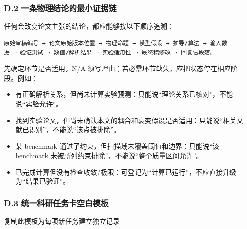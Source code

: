 \documentclass[
  chinese,
  UTF8]{ctexart}
\providecommand{\tightlist}{%
  \setlength{\itemsep}{0pt}\setlength{\parskip}{0pt}}
\begin{document}
\subsubsection{D.2
一条物理结论的最小证据链}\label{d.2-ux4e00ux6761ux7269ux7406ux7ed3ux8bbaux7684ux6700ux5c0fux8bc1ux636eux94fe}

任何会改变论文主张的结论，都应能够按以下顺序追溯：

\texttt{原始审稿编号\ →\ 论文原始版本位置\ →\ 物理命题\ →\ 模型假设\ →\ 推导/算法\ →\ 输入数据\ →\ 验证测试\ →\ 数值/解析结果\ →\ 实验适用性\ →\ 最终稿修改\ →\ 回复信段落}。

先确定环节是否适用，N/A
须写理由；若必需环节缺失，应把状态停在相应阶段。例如：

\begin{itemize}
\tightlist
\item
  有正确解析关系，但尚未计算实验预测：只能说``理论关系已核对''，不能说``实验允许''。
\item
  找到实验论文，但尚未确认本文的耦合和衰变假设是否适用：只能说``相关文献已识别''，不能说``该点被排除''。
\item
  某 benchmark 通过了约束，但扫描域未覆盖阈值和边界：只能说``该
  benchmark 未被所列约束排除''，不能说``整个质量区间允许''。
\item
  已完成计算但没有检查收敛/极限：可登记为``计算已运行''，不应直接升级为``结果已验证''。
\end{itemize}

\subsubsection{D.3
统一科研任务卡空白模板}\label{d.3-ux7edfux4e00ux79d1ux7814ux4efbux52a1ux5361ux7a7aux767dux6a21ux677f}

复制此模板为每项新任务建立独立记录：
\end{document}
